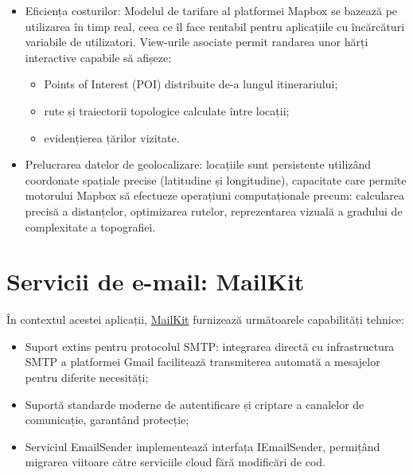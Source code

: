 \begin{itemize}
    \item  Eficiența costurilor: Modelul de tarifare al platformei Mapbox se bazează pe utilizarea în timp real, ceea ce îl face rentabil pentru aplicațiile cu încărcături variabile de utilizatori. View-urile asociate permit randarea unor hărți interactive capabile să afișeze:
        \begin{itemize}
            \item  Points of Interest (POI) distribuite de-a lungul itinerariului;
            \item  rute și traiectorii topologice calculate între locații;
            \item  evidențierea țărilor vizitate.
        \end{itemize}
    \item  Prelucrarea datelor de geolocalizare: locațiile sunt persistente utilizând coordonate spațiale precise (latitudine și longitudine), capacitate care permite motorului Mapbox să efectueze operațiuni computaționale precum: calcularea precisă a distanțelor, optimizarea rutelor, reprezentarea vizuală a gradului de complexitate a topografiei.

\end{itemize}

\section{Servicii de e-mail: MailKit}
În contextul acestei aplicații, \href{https://mimekit.net/docs/html/Introduction.htm}{MailKit}\cite{mail_ref} furnizează următoarele capabilități tehnice:

\begin{itemize}
    \item  Suport extins pentru protocolul SMTP: integrarea directă cu infrastructura SMTP a platformei Gmail facilitează transmiterea automată a mesajelor pentru diferite necesități;
    \item  Suportă standarde moderne de autentificare și criptare a canalelor de comunicație, garantând protecție;
    \item  Serviciul EmailSender implementează interfața IEmailSender, permițând migrarea viitoare către serviciile cloud fără modificări de cod.
\end{itemize}

